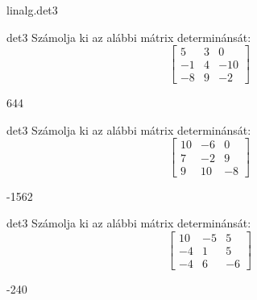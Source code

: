 \documentclass[12pt]{article}
\begin{document}
\begin{quiz}{linalg.det3}
\begin{numerical}{det3}
Számolja ki az alábbi mátrix determinánsát:
$$\left[\begin{array}{ccc}5& 3& 0\\ -1& 4& -10\\ -8& 9& -2\end{array}\right]$$

\item 644
\end{numerical}


\begin{numerical}{det3}
Számolja ki az alábbi mátrix determinánsát:
$$\left[\begin{array}{ccc}10& -6& 0\\ 7& -2& 9\\ 9& 10& -8\end{array}\right]$$

\item -1562
\end{numerical}


\begin{numerical}{det3}
Számolja ki az alábbi mátrix determinánsát:
$$\left[\begin{array}{ccc}10& -5& 5\\ -4& 1& 5\\ -4& 6& -6\end{array}\right]$$

\item -240
\end{numerical}\end{quiz}
\end{document}
